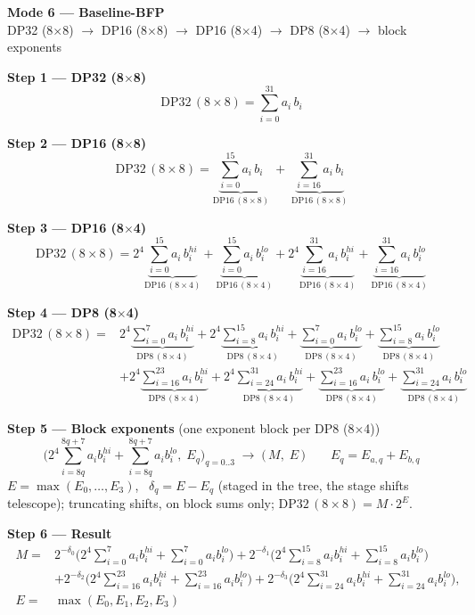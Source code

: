 \documentclass[fleqn]{article}
\newcommand{\DPop}[3]{\mathrm{DP#1}\,(#2\!\times\!#3)}
\begin{document}
\begin{center}
{\LARGE \textbf{Mode 6 --- Baseline-BFP}}\\[4pt]
{\large DP32 (8$\times$8) $\rightarrow$ DP16 (8$\times$8) $\rightarrow$ DP16 (8$\times$4) $\rightarrow$ DP8 (8$\times$4) $\rightarrow$ block exponents}
\end{center}

\vspace{0.3em}

\textbf{Step 1 --- DP32 (8$\times$8)}
\[ \DPop{32}{8}{8} = \sum_{i=0}^{31} a_i \, b_i \]

\textbf{Step 2 --- DP16 (8$\times$8)}
\[
\DPop{32}{8}{8}
  = \underbrace{\sum_{i=0}^{15} a_i \, b_i}_{\DPop{16}{8}{8}}
  \; + \; \underbrace{\sum_{i=16}^{31} a_i \, b_i}_{\DPop{16}{8}{8}}
\]

\textbf{Step 3 --- DP16 (8$\times$4)}
\[
\DPop{32}{8}{8}
  = 2^{4} \underbrace{\sum_{i=0}^{15} a_i \, b_i^{hi}}_{\DPop{16}{8}{4}}
  + \underbrace{\sum_{i=0}^{15} a_i \, b_i^{lo}}_{\DPop{16}{8}{4}}
  + 2^{4} \underbrace{\sum_{i=16}^{31} a_i \, b_i^{hi}}_{\DPop{16}{8}{4}}
  + \underbrace{\sum_{i=16}^{31} a_i \, b_i^{lo}}_{\DPop{16}{8}{4}}
\]

\textbf{Step 4 --- DP8 (8$\times$4)}
\begin{align*}
\DPop{32}{8}{8} = {}
  & 2^{4} \underbrace{\sum_{i=0}^{7} a_i \, b_i^{hi}}_{\DPop{8}{8}{4}}
  + 2^{4} \underbrace{\sum_{i=8}^{15} a_i \, b_i^{hi}}_{\DPop{8}{8}{4}}
  + \underbrace{\sum_{i=0}^{7} a_i \, b_i^{lo}}_{\DPop{8}{8}{4}}
  + \underbrace{\sum_{i=8}^{15} a_i \, b_i^{lo}}_{\DPop{8}{8}{4}} \\[0.3em]
  & + 2^{4} \underbrace{\sum_{i=16}^{23} a_i \, b_i^{hi}}_{\DPop{8}{8}{4}}
  + 2^{4} \underbrace{\sum_{i=24}^{31} a_i \, b_i^{hi}}_{\DPop{8}{8}{4}}
  + \underbrace{\sum_{i=16}^{23} a_i \, b_i^{lo}}_{\DPop{8}{8}{4}}
  + \underbrace{\sum_{i=24}^{31} a_i \, b_i^{lo}}_{\DPop{8}{8}{4}}
\end{align*}

\textbf{Step 5 --- Block exponents}\quad
{\small(one exponent block per DP8 (8$\times$4))}
\[
\Big(2^{4}\!\!\sum_{i=8q}^{8q+7}\! a_i b_i^{hi} + \!\!\sum_{i=8q}^{8q+7}\! a_i b_i^{lo},\; E_q\Big)_{q=0..3}
\;\longrightarrow\;
\Big(\, M ,\; E \,\Big)
\qquad
E_q = E_{a,q} + E_{b,q}
\]
$E=\max(E_0,\dots,E_3)$, \ $\delta_q=E-E_q$ (staged in the tree, the stage shifts telescope); \quad truncating shifts, on block sums only; \quad $\DPop{32}{8}{8}=M\cdot2^{E}$.

\textbf{Step 6 --- Result}
\[
\boxed{\;
\begin{aligned}
M ={}& 2^{-\delta_0}\Big(2^{4}\!\sum_{i=0}^{7} a_i b_i^{hi} + \sum_{i=0}^{7} a_i b_i^{lo}\Big)
  + 2^{-\delta_1}\Big(2^{4}\!\sum_{i=8}^{15} a_i b_i^{hi} + \sum_{i=8}^{15} a_i b_i^{lo}\Big) \\
  & + 2^{-\delta_2}\Big(2^{4}\!\sum_{i=16}^{23} a_i b_i^{hi} + \sum_{i=16}^{23} a_i b_i^{lo}\Big)
  + 2^{-\delta_3}\Big(2^{4}\!\sum_{i=24}^{31} a_i b_i^{hi} + \sum_{i=24}^{31} a_i b_i^{lo}\Big), \\[0.3em]
E ={}& \max(E_0,E_1,E_2,E_3)
\end{aligned}
\;}
\]
\end{document}
